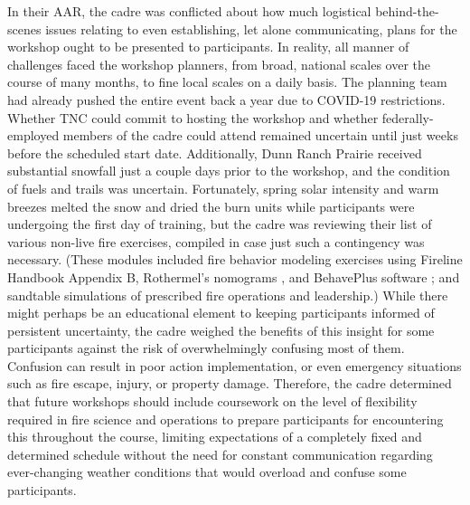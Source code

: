 \documentclass[fire,article,submit,moreauthors,pdftex]{Definitions/mdpi}
\begin{document}
In their AAR, the cadre was conflicted about how much logistical behind-the-scenes issues relating to even establishing, let alone communicating, plans for the workshop ought to be presented to participants.
In reality, all manner of challenges faced the workshop planners, from broad, national scales over the course of many months, to fine local scales on a daily basis.
The planning team had already pushed the entire event back a year due to COVID-19 restrictions.
Whether TNC could commit to hosting the workshop and whether federally-employed members of the cadre could attend remained uncertain until just weeks before the scheduled start date.
Additionally, Dunn Ranch Prairie received substantial snowfall just a couple days prior to the workshop, and the condition of fuels and trails was uncertain.
Fortunately, spring solar intensity and warm breezes melted the snow and dried the burn units while participants were undergoing the first day of training, but the cadre was reviewing their list of various non-live fire exercises, compiled in case just such a contingency was necessary.
(These modules included fire behavior modeling exercises using Fireline Handbook Appendix B, Rothermel's nomograms \citep{rothermel1983}, and BehavePlus software \citep{heinsch2010}; and sandtable simulations of prescribed fire operations and leadership.)
While there might perhaps be an educational element to keeping participants informed of persistent uncertainty, the cadre weighed the benefits of this insight for some participants against the risk of overwhelmingly confusing most of them.
Confusion can result in poor action implementation, or even emergency situations such as fire escape, injury, or property damage. 
Therefore, the cadre determined that future workshops should include coursework on the level of flexibility required in fire science and operations to prepare participants for encountering this throughout the course, limiting expectations of a completely fixed and determined schedule without the need for constant communication regarding ever-changing weather conditions that would overload and confuse some participants.
\end{document}
